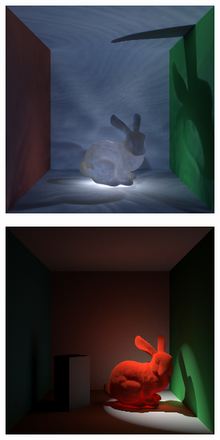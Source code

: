 \documentclass[10pt,compress,professionalfont]{beamer}
\begin{document}
\begin{frame}[c]{}

    {\centering
    \includegraphics[width=80mm]{../img/bunny_glow}\\
    }

\end{frame}




\begin{frame}[c]{}

    {\centering
    \includegraphics[width=80mm]{../img/ketchup_good_corrected}\\
    }

\end{frame}
\end{document}
